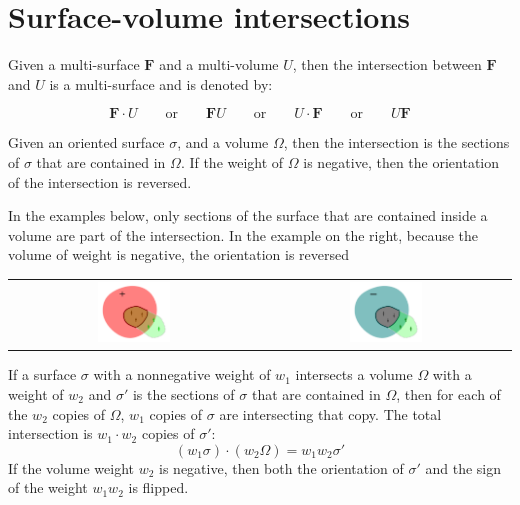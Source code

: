 \section{Surface-volume intersections} 

Given a multi-surface \(\mathbf{F}\) and a multi-volume \(U\), then the intersection between \(\mathbf{F}\) and \(U\) is a multi-surface and is denoted by:

\[\mathbf{F} \cdot U \quad\quad\text{or}\quad\quad \mathbf{F} U \quad\quad\text{or}\quad\quad U \cdot \mathbf{F} \quad\quad\text{or}\quad\quad U \mathbf{F}\]

Given an oriented surface \(\sigma\), and a volume \(\Omega\), then the intersection is the sections of \(\sigma\) that are contained in \(\Omega\). If the weight of \(\Omega\) is negative, then the orientation of the intersection is reversed.  

In the examples below, only sections of the surface that are contained inside a volume are part of the intersection. In the example on the right, because the volume of weight is negative, the orientation is reversed

\begin{center}
\begin{tabular}{cc}
\includegraphics[width = 0.3\textwidth]{Intersections/Surface-volume_intersections/surface_volume_intersections_example_1}
& 
\includegraphics[width = 0.3\textwidth]{Intersections/Surface-volume_intersections/surface_volume_intersections_example_2}
\end{tabular}
\end{center}

If a surface \(\sigma\) with a nonnegative weight of \(w_1\) intersects a volume \(\Omega\) with a weight of \(w_2\) and \(\sigma'\) is the sections of \(\sigma\) that are contained in \(\Omega\), then for each of the \(w_2\) copies of \(\Omega\), \(w_1\) copies of \(\sigma\) are intersecting that copy. The total intersection is \(w_1 \cdot w_2\) copies of \(\sigma'\):
\[(w_1 \sigma) \cdot (w_2 \Omega) = w_1 w_2 \sigma'\] 
If the volume weight \(w_2\) is negative, then both the orientation of \(\sigma'\) and the sign of the weight \(w_1 w_2\) is flipped. 

